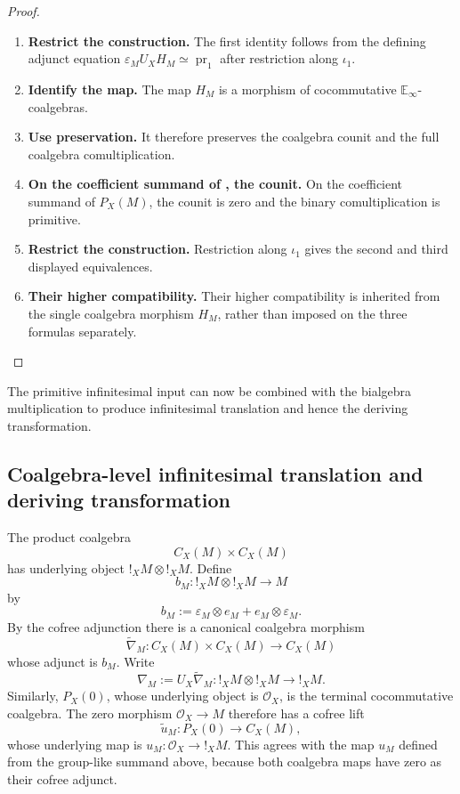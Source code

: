 \begin{proof}
\leavevmode
\begin{enumerate}[label=\textup{(\arabic*)}]
    \item \textbf{Restrict the construction.}
    The first identity follows from the defining adjunct equation \(\varepsilon_MU_XH_M\simeq\operatorname{pr}_1\) after restriction
    along \(\iota_1\).

    \item \textbf{Identify the map.}
    The map \(H_M\) is a morphism of cocommutative \(\mathbb E_\infty\)-coalgebras.

    \item \textbf{Use preservation.}
    It therefore preserves the coalgebra counit and the full coalgebra comultiplication.

    \item \textbf{On the coefficient summand of , the counit.}
    On the coefficient summand of \(P_X(M)\), the counit is zero and the binary
    comultiplication is primitive.

    \item \textbf{Restrict the construction.}
    Restriction along \(\iota_1\) gives the second and third displayed equivalences.

    \item \textbf{Their higher compatibility.}
    Their higher compatibility is inherited from the single coalgebra morphism \(H_M\),
    rather than imposed on the three formulas separately.
\end{enumerate}
\end{proof}
The primitive infinitesimal input can now be combined with the bialgebra
multiplication to produce infinitesimal translation and hence the deriving
transformation.

\subsection{Coalgebra-level infinitesimal translation and deriving transformation}

\begin{construction}
\label{con:tangent-bialgebra-multiplication}
The product coalgebra
\[
    C_X(M)\times C_X(M)
\]
has underlying object \(!_XM\otimes !_XM\). Define
\[
    b_M:
    !_XM\otimes !_XM
    \longrightarrow
    M
\]
by
\[
    b_M
    :=
    \varepsilon_M\otimes e_M+e_M\otimes\varepsilon_M.
\]
By the cofree adjunction there is a canonical coalgebra morphism
\[
    \widetilde\nabla_M:
    C_X(M)\times C_X(M)
    \longrightarrow
    C_X(M)
\]
whose adjunct is \(b_M\). Write
\[
    \nabla_M:=U_X\widetilde\nabla_M:
    !_XM\otimes !_XM\longrightarrow !_XM.
\]
Similarly, \(P_X(0)\), whose underlying object is \(\mathcal O_X\), is the
terminal cocommutative coalgebra. The zero morphism
\(\mathcal O_X\to M\) therefore has a cofree lift
\[
    \widetilde u_M:P_X(0)
    \longrightarrow C_X(M),
\]
whose underlying map is \(u_M:\mathcal O_X\to !_XM\). This agrees with the
map \(u_M\) defined from the group-like summand above, because both coalgebra
maps have zero as their cofree adjunct.
\end{construction}

